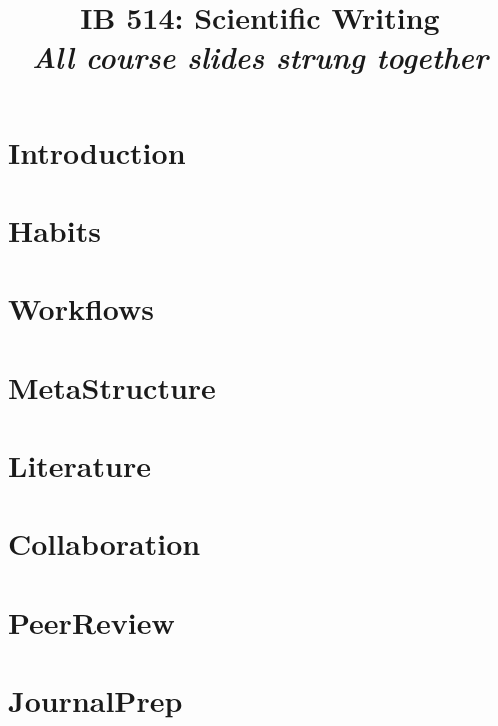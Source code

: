 \documentclass{beamer}
\title{\textbf{IB 514: Scientific Writing}\\{\footnotesize \textit{All course slides strung together}}}
\newcommand{\addsectionpdf}[1]{%
    \section{#1}
    
    \begin{frame}
        \tableofcontents
    \end{frame}
}
\begin{document}
    \begin{frame}
        \maketitle
    \end{frame}

    \begin{frame}
        \tableofcontents
    \end{frame}

    \addsectionpdf{Introduction}
    \addsectionpdf{Habits}
    \addsectionpdf{Workflows}
    \addsectionpdf{MetaStructure}
    \addsectionpdf{Literature}
    \addsectionpdf{Collaboration}
    \addsectionpdf{PeerReview}
    \addsectionpdf{JournalPrep}
\end{document}
